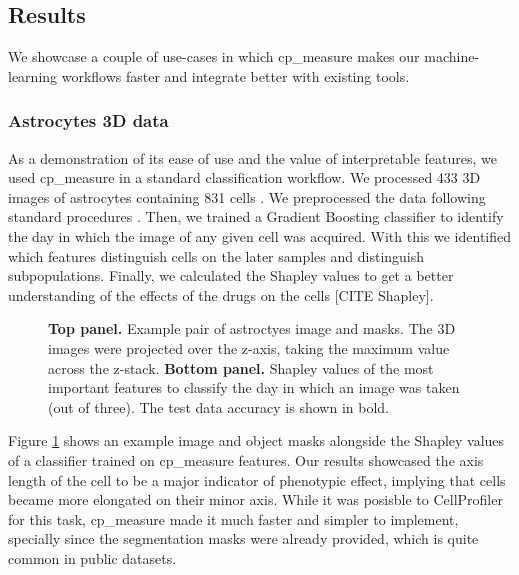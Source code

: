 \documentclass{article}
\begin{document}
\subsection{Results}
\label{sec:orge5b5c6b}
We showcase a couple of use-cases in which cp\_measure makes our machine-learning workflows faster and integrate better with existing tools.
\subsubsection{Astrocytes 3D data}
\label{sec:org447090b}

As a demonstration of its ease of use and the value of interpretable features, we used cp\_measure in a standard classification workflow. We processed 433 3D images of astrocytes containing 831 cells \citep{kalinin3DCellNuclear2018}. We preprocessed the data following standard procedures \citep{caicedoDataanalysisStrategiesImagebased2017}. Then, we trained a Gradient Boosting classifier to identify the day in which the image of any given cell was acquired. With this we identified which features distinguish cells on the later samples and distinguish subpopulations. Finally, we calculated the Shapley values to get a better understanding of the effects of the drugs on the cells [CITE Shapley].

\begin{figure}[htbp]
\centering

\caption{\label{fig:astrocytes}\textbf{Top panel.} Example pair of astroctyes image and masks. The 3D images were projected over the z-axis, taking the maximum value across the z-stack. \textbf{Bottom panel.} Shapley values of the most important features to classify the day in which an image was taken (out of three). The test data accuracy is shown in bold.}
\end{figure}

Figure \ref{fig:astrocytes} shows an example image and object masks alongside the Shapley values of a classifier trained on cp\_measure features. Our results showcased the axis length of the cell to be a major indicator of phenotypic effect, implying that cells became more elongated on their minor axis. While it was posisble to CellProfiler for this task, cp\_measure made it much faster and simpler to implement, specially since the segmentation masks were already provided, which is quite common in public datasets.
\end{document}
